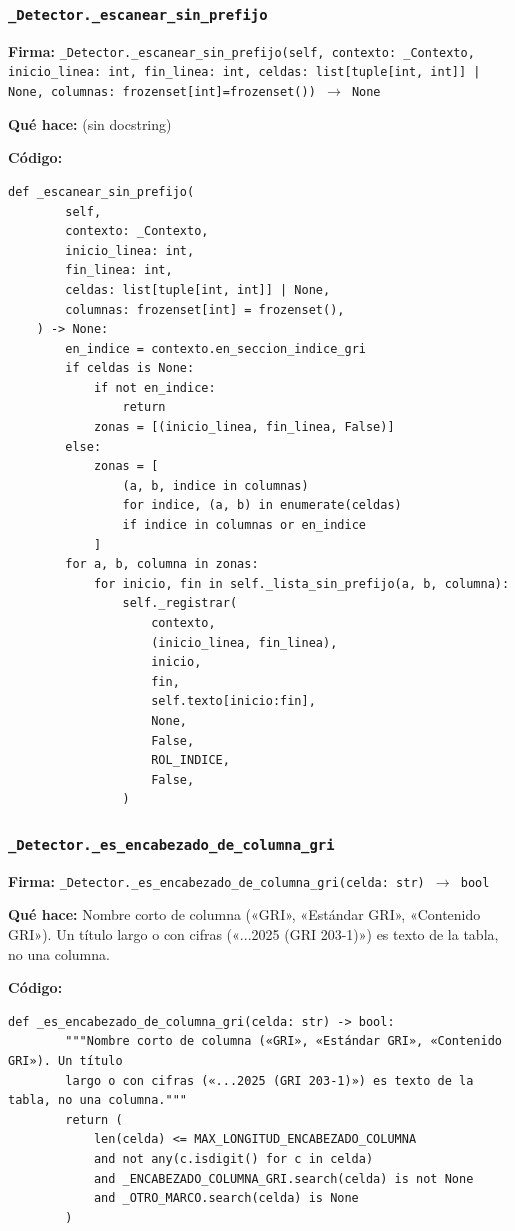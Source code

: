 \documentclass[11pt,a4paper]{article}
\begin{document}
\subsubsection*{\texttt{\_Detector.\_escanear\_sin\_prefijo}}
\textbf{Firma:} \texttt{\_Detector.\_escanear\_sin\_prefijo(self, contexto: \_Contexto, inicio\_linea: int, fin\_linea: int, celdas: list[tuple[int, int]] | None, columnas: frozenset[int]=frozenset()) $\rightarrow$ None}

\textbf{Qué hace:} (sin docstring)

\textbf{Código:}
\begin{lstlisting}
def _escanear_sin_prefijo(
        self,
        contexto: _Contexto,
        inicio_linea: int,
        fin_linea: int,
        celdas: list[tuple[int, int]] | None,
        columnas: frozenset[int] = frozenset(),
    ) -> None:
        en_indice = contexto.en_seccion_indice_gri
        if celdas is None:
            if not en_indice:
                return
            zonas = [(inicio_linea, fin_linea, False)]
        else:
            zonas = [
                (a, b, indice in columnas)
                for indice, (a, b) in enumerate(celdas)
                if indice in columnas or en_indice
            ]
        for a, b, columna in zonas:
            for inicio, fin in self._lista_sin_prefijo(a, b, columna):
                self._registrar(
                    contexto,
                    (inicio_linea, fin_linea),
                    inicio,
                    fin,
                    self.texto[inicio:fin],
                    None,
                    False,
                    ROL_INDICE,
                    False,
                )
\end{lstlisting}

\subsubsection*{\texttt{\_Detector.\_es\_encabezado\_de\_columna\_gri}}
\textbf{Firma:} \texttt{\_Detector.\_es\_encabezado\_de\_columna\_gri(celda: str) $\rightarrow$ bool}

\textbf{Qué hace:} Nombre corto de columna («GRI», «Estándar GRI», «Contenido GRI»). Un título
largo o con cifras («...2025 (GRI 203-1)») es texto de la tabla, no una columna.

\textbf{Código:}
\begin{lstlisting}
def _es_encabezado_de_columna_gri(celda: str) -> bool:
        """Nombre corto de columna («GRI», «Estándar GRI», «Contenido GRI»). Un título
        largo o con cifras («...2025 (GRI 203-1)») es texto de la tabla, no una columna."""
        return (
            len(celda) <= MAX_LONGITUD_ENCABEZADO_COLUMNA
            and not any(c.isdigit() for c in celda)
            and _ENCABEZADO_COLUMNA_GRI.search(celda) is not None
            and _OTRO_MARCO.search(celda) is None
        )
\end{lstlisting}
\end{document}
